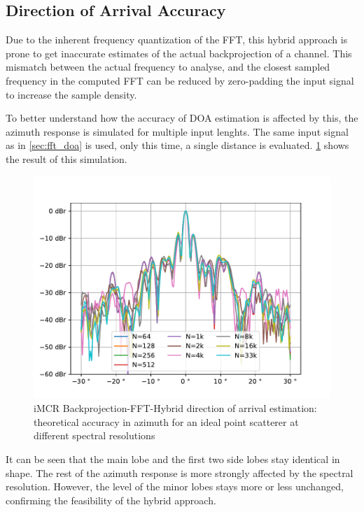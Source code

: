 \subsection{Direction of Arrival Accuracy}

Due to the inherent frequency quantization of the FFT,
this hybrid approach is prone to get inaccurate estimates of the actual backprojection of a channel.
This mismatch between the actual frequency to analyse, and the closest sampled frequency in the computed FFT
can be reduced by zero-padding the input signal to increase the sample density.

To better understand how the accuracy of DOA estimation is affected by this,
the azimuth response is simulated for multiple input lenghts.
The same input signal as in \cref{sec:fft_doa} is used, only this time, a single distance is evaluated.
\cref{fig:hybrid_azm_peak} shows the result of this simulation.
\begin{figure}
    \centering
    \includegraphics[width=\textwidth]{../figures/hybrid_azm_peak.pdf}
    \caption{iMCR Backprojection-FFT-Hybrid direction of arrival estimation:
        theoretical accuracy in azimuth for an ideal point scatterer at different spectral resolutions}
    \label{fig:hybrid_azm_peak}
\end{figure}

It can be seen that the main lobe and the first two side lobes stay identical in shape.
The rest of the azimuth response is more strongly affected by the spectral resolution.
However, the level of the minor lobes stays more or less unchanged,
confirming the feasibility of the hybrid approach.

